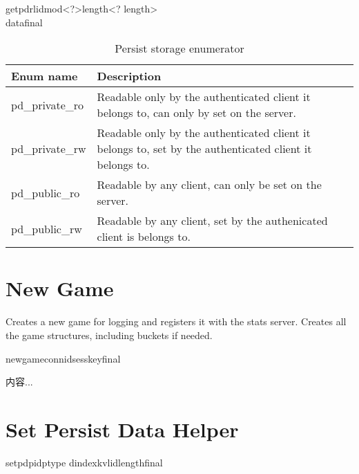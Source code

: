 \documentclass[oneside,titlepage,a4paper]{Definition/retrospy} %
\begin{document}
\begin{mybox}
\tbs getpdr\tbs lid\tbs mod\tbs<?>\tbs length\tbs<? length>\\\tbs data\tbs final\tbs
\end{mybox}

\begin{table}
	\centering
\begin{tabular}{|l|p{8cm}|}
	\hline
	\textbf{Enum name}&\textbf{Description}\\\hline
	pd\_private\_ro& Readable only by the authenticated client it belongs to, can only by set on the server.\\\hline
	pd\_private\_rw& Readable only by the authenticated client it belongs to, set by the authenticated client it belongs to.\\\hline
	pd\_public\_ro& Readable by any client, can only be set on the server.\\\hline
	pd\_public\_rw& Readable by any client, set by the authenicated client is belongs to.\\\hline
\end{tabular}
	\caption{Persist storage enumerator}
\label{Persist storage enumerator}
\end{table}

\section{New Game}
Creates a new game for logging and registers it with the stats server. 
Creates all the game structures, including buckets if needed.
\ClientRequest

\begin{mybox}
	\tbs newgame\tbs\tbs connid\tbs<connection id>\tbs sesskey\tbs<session key>\tbs final\tbs
\end{mybox}

\ServerResponse

\begin{mybox}
	内容...
\end{mybox}

\section{Set Persist Data Helper}
\ClientRequest
\begin{mybox}
	\tbs setpd\tbs\tbs pid\tbs<profile id>\tbs ptype\tbs <persist storage type> \tbs dindex\tbs<data index>\tbs kv\tbs<key value flag>\tbs lid\tbs <local id>\tbs length\tbs<size of game defined data>\tbs final\tbs
\end{mybox}
\end{document}
